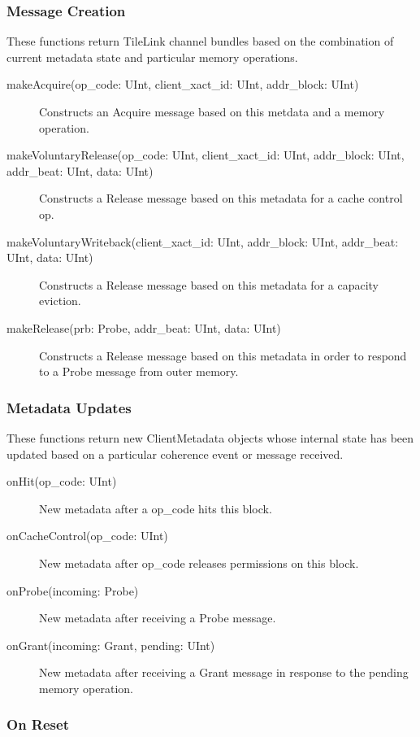 \subsubsection{Message Creation}

These functions return TileLink channel bundles based on the combination of current metadata state and particular memory operations.

\begin{description}
\item[makeAcquire(op\_code: UInt, client\_xact\_id: UInt, addr\_block: UInt) ]
Constructs an Acquire message based on this metdata and a memory operation.
\item[makeVoluntaryRelease(op\_code: UInt, client\_xact\_id: UInt, addr\_block: UInt, addr\_beat: UInt, data: UInt) ]
Constructs a Release message based on this metadata for a cache control op.
\item[makeVoluntaryWriteback(client\_xact\_id: UInt, addr\_block: UInt, addr\_beat: UInt, data: UInt) ]
Constructs a Release message based on this metadata for a capacity eviction.
\item[makeRelease(prb: Probe, addr\_beat: UInt, data: UInt) ]
Constructs a Release message based on this metadata in order to respond to a Probe message from outer memory.
\end{description}

\subsubsection{Metadata Updates}

These functions return new ClientMetadata objects whose internal state has been updated based on a particular coherence event or message received.

\begin{description}
\item[onHit(op\_code: UInt) ]
New metadata after a op\_code hits this block.
\item[onCacheControl(op\_code: UInt) ]
New metadata after op\_code releases permissions on this block.
\item[onProbe(incoming: Probe) ]
New metadata after receiving a Probe message.
\item[onGrant(incoming: Grant, pending: UInt) ]
New metadata after receiving a Grant message in response to the pending memory operation.
\end{description}

\subsubsection{On Reset}

